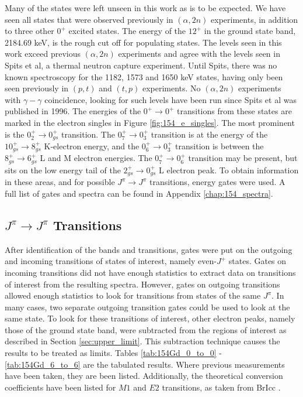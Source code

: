 Many of the states were left unseen in this work as is to be expected. We have seen all states that were observed previously in $(\alpha,2n)$ experiments, in addition to three other $0^+$ excited states. The energy of the $12^+$ in the ground state band, 2184.69 keV, is the rough cut off for populating states. The levels seen in this work exceed previous $(\alpha,2n)$ experiments and agree with the levels seen in Spits et al, a thermal neutron capture experiment\citep{spits96:_154gd}. Until Spits, there was no known spectroscopy for the 1182, 1573 and 1650 keV states, having only been seen previously in $(p,t)$ and $(t,p)$ experiments. No $(\alpha,2n)$ experiments with $\gamma-\gamma$ coincidence, looking for such levels have been run since Spits et al was published in 1996. The energies of the $0^+\rightarrow0^+$ transitions from these states are marked in the electron singles in Figure \ref{fig:154_e_singles}. The most prominent is the $0^+_{2}\rightarrow0^+_{gs}$ transition. The $0^+_{7}\rightarrow0^+_{3}$ transition is at the energy of the $10^+_{gs}\rightarrow8^+_{gs}$ K-electron energy, and the $0^+_{6}\rightarrow0^+_{3}$ transition is between the $8^+_{gs}\rightarrow6^+_{gs}$ L and M electron energies. The $0^+_{7}\rightarrow0^+_{6}$ transition may be present, but sits on the low energy tail of the $2^+_{gs}\rightarrow0^+_{gs}$ L electron peak. To obtain information in these areas, and for possible $J^{\pi}\rightarrow J^{\pi}$ transitions, energy gates were used. A full list of gates and spectra can be found in Appendix \ref{chap:154_spectra}.



\subsection{$J^{\pi}\rightarrow J^{\pi}$ Transitions}

After identification of the bands and transitions, gates were put on the outgoing and incoming transitions of states of interest, namely even-$J^{+}$ states. Gates on incoming transitions did not have enough statistics to extract data on transitions of interest from the resulting spectra. However, gates on outgoing transitions allowed enough statistics to look for transitions from states of the same $J^{\pi}$. In many cases, two separate outgoing transition gates could be used to look at the same state. To look for these transitions of interest, other electron peaks, namely those of the ground state band, were subtracted from the regions of interest as described in Section \ref{sec:upper_limit}. This subtraction technique causes the results to be treated as limits. Tables \ref{tab:154Gd_0_to_0} - \ref{tab:154Gd_6_to_6} are the tabulated results. Where previous measurements have been taken, they are been listed. Additionally, the theoretical conversion coefficients have been listed for $M1$ and $E2$ transitions, as taken from BrIcc \cite{kibedi08:_BRICC}.

